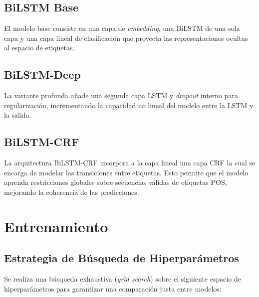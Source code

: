 \documentclass[12pt, a4paper]{article}
\begin{document}
\subsection{BiLSTM Base}

El modelo base consiste en una capa de \textit{embedding}, una BiLSTM de una
sola capa y una capa lineal de clasificación que proyecta las representaciones
ocultas al espacio de etiquetas.

\subsection{BiLSTM-Deep}

La variante profunda añade una segunda capa LSTM y \textit{dropout} interno para
regularización, incrementando la capacidad no lineal del modelo entre la LSTM y
la salida.

\subsection{BiLSTM-CRF}

La arquitectura BiLSTM-CRF incorpora a la capa lineal una capa CRF la cual se encarga de modelar las transiciones entre etiquetas. Esto permite que el modelo aprenda restricciones globales sobre secuencias válidas de etiquetas POS, mejorando la coherencia de las predicciones.

\section{Entrenamiento}

\subsection{Estrategia de Búsqueda de Hiperparámetros}

Se realiza una búsqueda exhaustiva (\textit{grid search}) sobre el siguiente
espacio de hiperparámetros para garantizar una comparación justa entre modelos:
\end{document}
